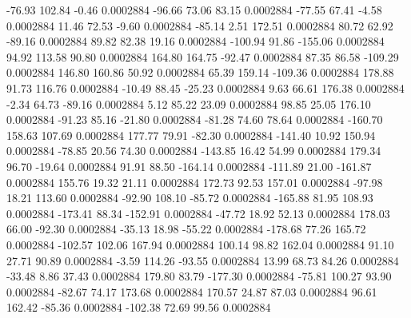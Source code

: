       -76.93      102.84       -0.46     0.0002884
      -96.66       73.06       83.15     0.0002884
      -77.55       67.41       -4.58     0.0002884
       11.46       72.53       -9.60     0.0002884
      -85.14        2.51      172.51     0.0002884
       80.72       62.92      -89.16     0.0002884
       89.82       82.38       19.16     0.0002884
     -100.94       91.86     -155.06     0.0002884
       94.92      113.58       90.80     0.0002884
      164.80      164.75      -92.47     0.0002884
       87.35       86.58     -109.29     0.0002884
      146.80      160.86       50.92     0.0002884
       65.39      159.14     -109.36     0.0002884
      178.88       91.73      116.76     0.0002884
      -10.49       88.45      -25.23     0.0002884
        9.63       66.61      176.38     0.0002884
       -2.34       64.73      -89.16     0.0002884
        5.12       85.22       23.09     0.0002884
       98.85       25.05      176.10     0.0002884
      -91.23       85.16      -21.80     0.0002884
      -81.28       74.60       78.64     0.0002884
     -160.70      158.63      107.69     0.0002884
      177.77       79.91      -82.30     0.0002884
     -141.40       10.92      150.94     0.0002884
      -78.85       20.56       74.30     0.0002884
     -143.85       16.42       54.99     0.0002884
      179.34       96.70      -19.64     0.0002884
       91.91       88.50     -164.14     0.0002884
     -111.89       21.00     -161.87     0.0002884
      155.76       19.32       21.11     0.0002884
      172.73       92.53      157.01     0.0002884
      -97.98       18.21      113.60     0.0002884
      -92.90      108.10      -85.72     0.0002884
     -165.88       81.95      108.93     0.0002884
     -173.41       88.34     -152.91     0.0002884
      -47.72       18.92       52.13     0.0002884
      178.03       66.00      -92.30     0.0002884
      -35.13       18.98      -55.22     0.0002884
     -178.68       77.26      165.72     0.0002884
     -102.57      102.06      167.94     0.0002884
      100.14       98.82      162.04     0.0002884
       91.10       27.71       90.89     0.0002884
       -3.59      114.26      -93.55     0.0002884
       13.99       68.73       84.26     0.0002884
      -33.48        8.86       37.43     0.0002884
      179.80       83.79     -177.30     0.0002884
      -75.81      100.27       93.90     0.0002884
      -82.67       74.17      173.68     0.0002884
      170.57       24.87       87.03     0.0002884
       96.61      162.42      -85.36     0.0002884
     -102.38       72.69       99.56     0.0002884
